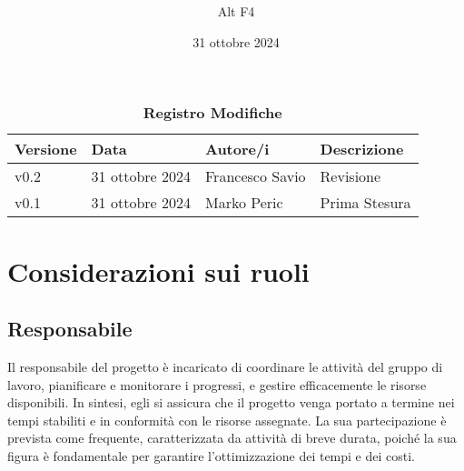 \documentclass[a4paper, 12pt]{article}
\title{\Huge \textbf{\titolo}}
\author{\Large{Alt} \raisebox{0.3ex}{\normalsize  +} \Large{F4}}
\date{31 ottobre 2024}
\def\logo{Immagini/logo.jpeg}
\def\ultima-versione{v0.2}
\begin{document}
\begin{titlepage}      
    \maketitle
    \thispagestyle{empty}  

\end{titlepage}
\tableofcontents

\newpage

\begin{table}[!h]
    \centering
    \caption*{\textbf{\Large Registro Modifiche}}
    {\renewcommand{\arraystretch}{2}
    \begin{tabularx}{\textwidth}{| X | X | X | X |}
        \hline
            \textbf{\large Versione} & 
            \textbf{\large Data} & 
            \textbf{\large Autore/i} & 
            \textbf{\large Descrizione} \\ 
        \hline 
        \hline
            \ultima-versione & 
            31 ottobre 2024 & 
            Francesco Savio & 
            Revisione \\
        \hline
            v0.1 & 
            31 ottobre 2024 & 
            Marko Peric & 
            Prima Stesura \\
        \hline 
    \end{tabularx}}
\end{table}

\newpage

\section{Considerazioni sui ruoli}
\subsection{Responsabile}
Il responsabile del progetto è incaricato di coordinare le attività del gruppo di lavoro, pianificare e monitorare i progressi, e gestire efficacemente le risorse disponibili. 
In sintesi, egli si assicura che il progetto venga portato a termine nei tempi stabiliti e in conformità con le risorse assegnate. La sua partecipazione è prevista come frequente, caratterizzata da attività di breve durata,
poiché la sua figura è fondamentale per garantire l’ottimizzazione dei tempi e dei costi.
\end{document}
